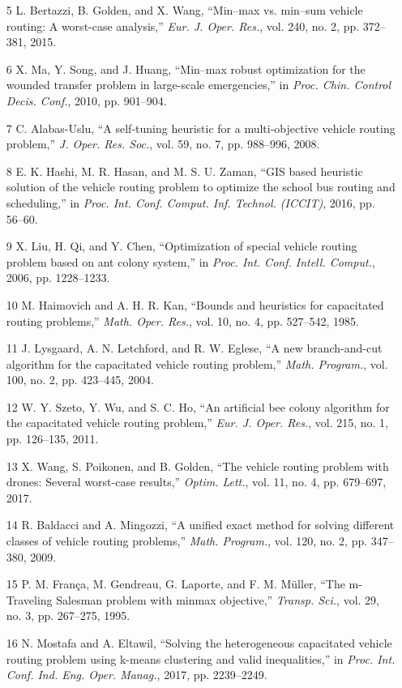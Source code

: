 \documentclass{article}
\begin{document}
	\begin{itemize}
		\item [5] L. Bertazzi, B. Golden, and X. Wang, “Min–max vs. min–sum vehicle routing: A worst-case analysis,” \textit{Eur. J. Oper. Res.}, vol. 240, no. 2, pp. 372–381, 2015.
		\item [6] X. Ma, Y. Song, and J. Huang, “Min–max robust optimization for the wounded transfer problem in large-scale emergencies,” in \textit{Proc. Chin. Control Decis. Conf.}, 2010, pp. 901–904.
		\item [7] C. Alabas-Uslu, “A self-tuning heuristic for a multi-objective vehicle routing problem,” \textit{J. Oper. Res. Soc.}, vol. 59, no. 7, pp. 988–996, 2008.
		\item [8] E. K. Hashi, M. R. Hasan, and M. S. U. Zaman, “GIS based heuristic solution of the vehicle routing problem to optimize the school bus routing and scheduling,” in \textit{Proc. Int. Conf. Comput. Inf. Technol. (ICCIT)}, 2016, pp. 56–60.
		\item [9] X. Liu, H. Qi, and Y. Chen, “Optimization of special vehicle routing problem based on ant colony system,” in \textit{Proc. Int. Conf. Intell. Comput.}, 2006, pp. 1228–1233.
		\item [10] M. Haimovich and A. H. R. Kan, “Bounds and heuristics for capacitated routing problems,” \textit{Math. Oper. Res.}, vol. 10, no. 4, pp. 527–542, 1985.
		\item [11] J. Lysgaard, A. N. Letchford, and R. W. Eglese, “A new branch-and-cut algorithm for the capacitated vehicle routing problem,” \textit{Math. Program.}, vol. 100, no. 2, pp. 423–445, 2004.
		\item [12] W. Y. Szeto, Y. Wu, and S. C. Ho, “An artificial bee colony algorithm for the capacitated vehicle routing problem,” \textit{Eur. J. Oper. Res.}, vol. 215, no. 1, pp. 126–135, 2011.
		\item [13] X. Wang, S. Poikonen, and B. Golden, “The vehicle routing problem with drones: Several worst-case results,” \textit{Optim. Lett.}, vol. 11, no. 4, pp. 679–697, 2017.
		\item [14] R. Baldacci and A. Mingozzi, “A unified exact method for solving different classes of vehicle routing problems,” \textit{Math. Program.}, vol. 120, no. 2, pp. 347–380, 2009.
		\item [15] P. M. França, M. Gendreau, G. Laporte, and F. M. Müller, “The m-Traveling Salesman problem with minmax objective,” \textit{Transp. Sci.}, vol. 29, no. 3, pp. 267–275, 1995.
		\item [16] N. Mostafa and A. Eltawil, “Solving the heterogeneous capacitated vehicle routing problem using k-means clustering and valid inequalities,” in \textit{Proc. Int. Conf. Ind. Eng. Oper. Manag.}, 2017, pp. 2239–2249.

\end{itemize}
\end{document}
